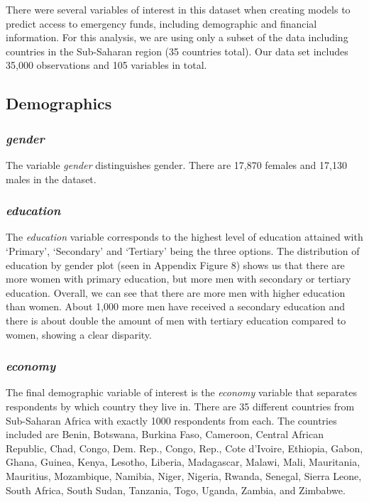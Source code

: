 \documentclass[water,article,submit,moreauthors,pdftex]{mdpi}
\begin{document}
There were several variables of interest in this dataset when creating
models to predict access to emergency funds, including demographic and
financial information. For this analysis, we are using only a subset of
the data including countries in the Sub-Saharan region (35 countries
total). Our data set includes 35,000 observations and 105 variables in
total.

\hypertarget{demographics}{%
\subsection{Demographics}\label{demographics}}

\hypertarget{gender}{%
\subsubsection{\texorpdfstring{\emph{gender}}{gender}}\label{gender}}

The variable \emph{gender} distinguishes gender. There are 17,870
females and 17,130 males in the dataset.

\hypertarget{education}{%
\subsubsection{\texorpdfstring{\emph{education}}{education}}\label{education}}

The \emph{education} variable corresponds to the highest level of
education attained with `Primary', `Secondary' and `Tertiary' being the
three options. The distribution of education by gender plot (seen in
Appendix Figure 8) shows us that there are more women with primary
education, but more men with secondary or tertiary education. Overall,
we can see that there are more men with higher education than women.
About 1,000 more men have received a secondary education and there is
about double the amount of men with tertiary education compared to
women, showing a clear disparity.

\hypertarget{economy}{%
\subsubsection{\texorpdfstring{\emph{economy}}{economy}}\label{economy}}

The final demographic variable of interest is the \emph{economy}
variable that separates respondents by which country they live in. There
are 35 different countries from Sub-Saharan Africa with exactly 1000
respondents from each. The countries included are Benin, Botswana,
Burkina Faso, Cameroon, Central African Republic, Chad, Congo, Dem.
Rep., Congo, Rep., Cote d'Ivoire, Ethiopia, Gabon, Ghana, Guinea, Kenya,
Lesotho, Liberia, Madagascar, Malawi, Mali, Mauritania, Mauritius,
Mozambique, Namibia, Niger, Nigeria, Rwanda, Senegal, Sierra Leone,
South Africa, South Sudan, Tanzania, Togo, Uganda, Zambia, and Zimbabwe.
\end{document}
